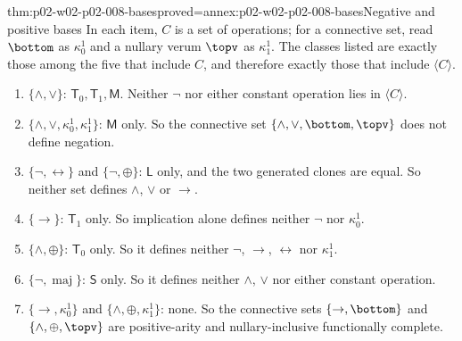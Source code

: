 \begin{hbtheorem}{thm:p02-w02-p02-008-bases}{proved=annex:p02-w02-p02-008-bases}{Negative and positive bases}
In each item, \(C\) is a set of operations; for a connective set, read
\(\bottom\) as \(\kappa^1_0\) and a nullary verum \(\topv\) as
\(\kappa^1_1\).  The classes listed are exactly those among the five that
include \(C\), and therefore exactly those that include
\(\langle C\rangle\).
\begin{enumerate}
\item \(\{\land,\lor\}\): \(\mathsf T_0,\mathsf T_1,\mathsf M\).  Neither
  \(\neg\) nor either constant operation lies in \(\langle C\rangle\).
\item \(\{\land,\lor,\kappa^1_0,\kappa^1_1\}\): \(\mathsf M\) only.  So the
  connective set \(\{\land,\lor,\bottom,\topv\}\) does not define negation.
\item \(\{\neg,\leftrightarrow\}\) and \(\{\neg,\oplus\}\): \(\mathsf L\)
  only, and the two generated clones are equal.  So neither set defines
  \(\land\), \(\lor\) or \(\to\).
\item \(\{\to\}\): \(\mathsf T_1\) only.  So implication alone defines
  neither \(\neg\) nor \(\kappa^1_0\).
\item \(\{\land,\oplus\}\): \(\mathsf T_0\) only.  So it defines neither
  \(\neg\), \(\to\), \(\leftrightarrow\) nor \(\kappa^1_1\).
\item \(\{\neg,\operatorname{maj}\}\): \(\mathsf S\) only.  So it defines
  neither \(\land\), \(\lor\) nor either constant operation.
\item \(\{\to,\kappa^1_0\}\) and \(\{\land,\oplus,\kappa^1_1\}\): none.
  So the connective sets \(\{\to,\bottom\}\) and \(\{\land,\oplus,\topv\}\)
  are positive-arity and nullary-inclusive functionally complete.
\end{enumerate}
\end{hbtheorem}

